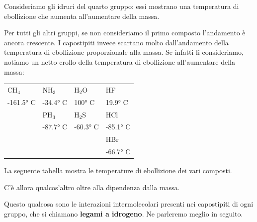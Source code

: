 Consideriamo gli idruri del quarto gruppo: essi mostrano una temperatura di ebollizione che aumenta all'aumentare della massa.

Per tutti gli altri gruppi, se non consideriamo il primo composto l'andamento è ancora crescente. I capostipiti invece scartano molto dall'andamento della temperatura di ebollizione proporzionale alla massa. Se infatti li consideriamo, notiamo un netto crollo della temperatura di ebollizione all'aumentare della massa:

\begin{center}
    \begin{tabular}{m{2cm}m{2cm}m{2cm}m{2cm}}
    CH$_4$ & NH$_3$ & H$_2$O & HF\\[0.8ex]
    \hspace{-0.4cm}-161.5° C & \hspace{-0.3cm}-34.4° C & \hspace{-0.2cm}100° C & \hspace{-0.3cm}19.9° C\\[0.8ex]
    & PH$_3$ & H$_2$S & HCl\\[0.8ex]
    & \hspace{-0.3cm}-87.7° C & \hspace{-0.3cm}-60.3° C & \hspace{-0.3cm}-85.1° C\\[0.8ex]
    &&& HBr\\[0.8ex]
    &&& \hspace{-0.3cm}-66.7° C
    \end{tabular}
\end{center}

La seguente tabella mostra le temperature di ebollizione dei vari composti.

\vspace{0.2cm}C'è allora qualcos'altro oltre alla dipendenza dalla massa.

Questo qualcosa sono le interazioni intermolecolari presenti nei capostipiti di ogni gruppo, che si chiamano \textbf{legami a idrogeno}. Ne parleremo meglio in seguito.

